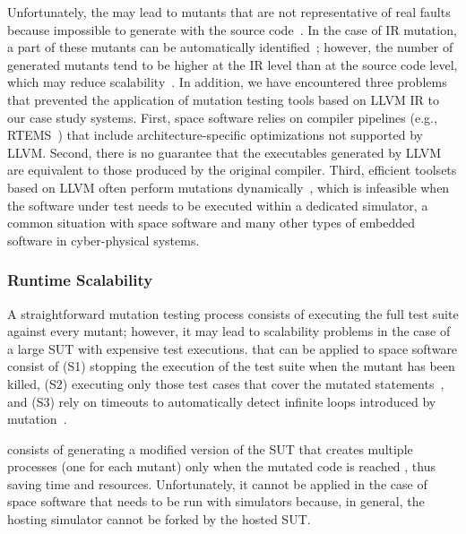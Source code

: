 Unfortunately, the 
may lead to mutants that are not representative of real faults because impossible to generate with the source code~\cite{schuler2009efficient}.
In the case of IR mutation, a part of these mutants can be automatically identified~\cite{denisov2018mull}; however,
the number of generated mutants tend to be higher at the IR level than at the source code level, which may reduce scalability~\cite{hariri2019comparing}.
 In addition, we have encountered three problems that prevented the application of
 mutation testing tools based on  LLVM IR to our case study systems.
First, space software relies on compiler pipelines (e.g., RTEMS~\cite{RTEMS}) that include architecture-specific optimizations not supported by LLVM.
Second, there is no guarantee that the executables generated by LLVM are equivalent to those produced by the original compiler.
 Third, efficient toolsets based on LLVM often  perform mutations dynamically~\cite{denisov2018mull}, which is infeasible when the software under test needs to be executed within a dedicated simulator, a common situation with space software and many other types of embedded software in cyber-physical systems.




\subsubsection{Runtime Scalability}
\label{sec:scalability}

A straightforward mutation testing process consists of executing the full test suite against every mutant; however, it may lead to scalability problems in the case of a large SUT with expensive test executions.
 that can be applied to space software consist of (S1) stopping the execution of the test suite when the mutant has been killed, (S2) executing only those test cases that cover the mutated statements~\cite{delamaro1996proteum}, and (S3) rely on timeouts to automatically detect infinite loops introduced by mutation~\cite{papadakis2019mutation}.

 consists of generating a modified version of the SUT that creates multiple processes (one for each mutant) only when the mutated code is reached \cite{king1991fortran,tokumoto2016muvm}, thus saving time and resources. Unfortunately, it cannot be applied in the case of space software that needs to be run with simulators because, in general, the hosting simulator cannot be forked by the hosted SUT.

